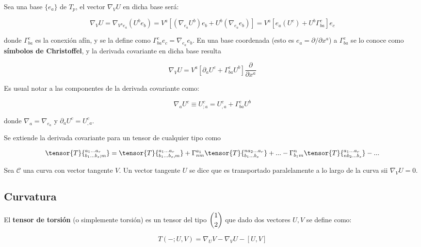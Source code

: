 Sea una base $\{e_a\}$ de $T_p$, el vector $\nabla_VU$ en dicha base será:

\begin{equation*}
    \nabla_VU=\nabla_{V^ae_a}(U^be_b)=V^a[(\nabla_{e_a}U^b)e_b+U^b(\nabla_{e_a}e_b)]=V^a[e_a(U^c)+U^b\Gamma^c_{ba}]e_c
\end{equation*}

donde $\Gamma^c_{ba}$ es la conexión afín, y se la define como $\Gamma^c_{ba}e_c=\nabla_{e_a}e_b$. En una base coordenada (esto es $e_a=\partial/\partial x^a$) a $\Gamma^c_{ba}$ se lo conoce como \textbf{símbolos de Christoffel}, y la derivada covariante en dicha base resulta

\begin{equation*}
    \nabla_VU=V^a[\partial_aU^c+\Gamma^c_{ba}U^b]\frac{\partial}{\partial x^a}
\end{equation*}

Es usual notar a las componentes de la derivada covariante como:

\begin{equation*}
    \nabla_aU^c\equiv U^c_{;a}=U^c_{,a}+\Gamma^c_{ba}U^b
\end{equation*}

donde $\nabla_a=\nabla_{e_a}$ y $\partial_aU^c=U^c_{,a}$.

Se extiende la derivada covariante para un tensor de cualquier tipo como

\begin{equation*}
    \tensor{T}{^{a_1...a_r}_{b_1...b_s;m}}=\tensor{T}{^{a_1...a_r}_{b_1...b_s,m}}+\Gamma^{a_1}_{nm}\tensor{T}{^{na_2...a_r}_{b_1...b_s}}+...-\Gamma^n_{b_1m}\tensor{T}{^{a_1...a_r}_{nb_2...b_s}}-...
\end{equation*}

Sea $\mathcal{C}$ una curva con vector tangente $V$. Un vector tangente $U$ se dice que es transportado paralelamente a lo largo de la curva sii $\nabla_VU=0$.




\subsection{Curvatura}  \label{curvatura}

El \textbf{tensor de torsión} (o simplemente torsión) es un tensor del tipo $\dbinom{1}{2}$ que dado dos vectores $U,V$ se define como:

\begin{equation*}
    T(-;U,V)=\nabla_UV-\nabla_VU-[U,V]
\end{equation*}


